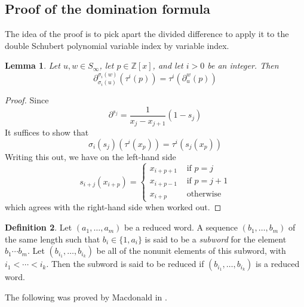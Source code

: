 \documentclass{amsart}
\newtheorem{lemma}{Lemma}[subsection]
\theoremstyle{definition}
\newtheorem{definition}[lemma]{Definition}
\theoremstyle{remark}
\numberwithin{equation}{subsection}
\newcommand{\shifthom}{\tau}
\newcommand{\shiftvby}[1]{\shifthom^{#1}}
\begin{document}
\subsection{Proof of the domination formula}

The idea of the proof is to pick apart the divided difference to apply it to the double Schubert polynomial variable index by variable index.

\begin{lemma} \label{lemma:varshift}
Let $u,w\in S_\infty$, let $p\in\mathbb{Z}[x]$, and let $i>0$ be an integer. Then
$$\partial_{\sigma_i(u)}^{\sigma_i(w)}(\shiftvby{i}(p))=\shiftvby{i}(\partial_u^w(p))$$
\end{lemma}
\begin{proof}
Since
$$\partial^{s_j}=\frac{1}{x_j-x_{j+1}}(1-s_j)$$
It suffices to show that
$$\sigma_i(s_j)(\shiftvby{i}(x_p))=\shiftvby{i}(s_j(x_p))$$
Writing this out, we have on the left-hand side
$$s_{i+j}(x_{i+p})=\begin{cases}
x_{i+p+1}&\mbox{ if }p=j\\
x_{i+p-1}&\mbox{ if }p=j+1\\
x_{i+p}&\mbox{ otherwise}
\end{cases}$$
which agrees with the right-hand side when worked out.
\end{proof}

\begin{definition}
Let $(a_1,\ldots,a_m)$ be a reduced word. A sequence $(b_1,\ldots,b_m)$ of the same length such that $b_i\in \{1,a_i\}$ is said to be a \emph{subword} for the element $b_1\cdots b_m$. Let $(b_{i_1},\ldots,b_{i_k})$ be all of the nonunit elements of this subword, with $i_1<\cdots<i_k$. Then the subword is said to be reduced if $(b_{i_1},\ldots,b_{i_k})$ is a reduced word.
\end{definition}



The following was proved by Macdonald in \cite{notes}.
\end{document}
